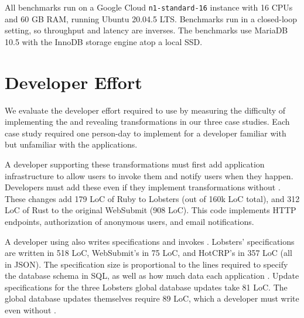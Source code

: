 All benchmarks run on a Google Cloud \texttt{n1-standard-16} instance with 16
CPUs and 60 GB RAM, running Ubuntu 20.04.5 LTS. Benchmarks run in a closed-loop
setting, so throughput and latency are inverses. %
%
The benchmarks use MariaDB 10.5 with the InnoDB storage engine atop a local SSD.
%

\section{\sys Developer Effort}
\label{s:eval-effort}


%
We evaluate the developer effort required to use \sys by measuring the
difficulty of implementing the \xxing and revealing transformations in our three
case studies.  Each case study required one person-day to implement for a developer
familiar with \sys but unfamiliar with the applications.

A developer supporting these transformations must first add application
infrastructure to allow users to invoke them and notify users when they happen.
Developers must add these even if they implement transformations without \sys.
%
These changes add 179 LoC of Ruby to Lobsters (out of 160k LoC total), and 312
LoC of Rust to the original WebSubmit (908 LoC). This code implements HTTP
endpoints, authorization of anonymous users, and email notifications.
%

%
A developer using \sys also writes \xx specifications and invokes \sys.
Lobsters' \xx specifications are written in 518 LoC, WebSubmit's in 75 LoC, and
HotCRP's in 357 LoC (all in JSON).  The specification size is proportional to
the lines required to specify the database schema in SQL, as well as how much data
each application \xxs.
%
Update specifications for the three Lobsters global database updates take 81
LoC. The global database updates themselves require 89 LoC, which a developer
must write even without \sys.
%

